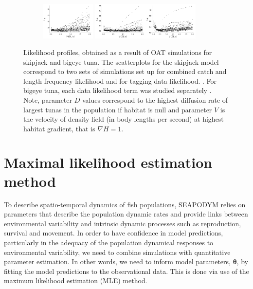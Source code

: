 \begin{figure}
\begin{subfigure}[b]{1.0\textwidth}
\includegraphics[width=0.3\textwidth]{chapter4/figs/SA-C-V-bet}
\includegraphics[width=0.3\textwidth]{chapter4/figs/SA-LF-V-bet}\includegraphics[width=0.3\textwidth]{chapter4/figs/SA-Tags-V-bet}\\
\end{subfigure}
\caption{Likelihood profiles, obtained as a result of OAT simulations for skipjack and bigeye tuna. The scatterplots for the skipjack model correspond to two sets of simulations set up for combined catch and length frequency likelihood and for tagging data likelihood. \citep*[From][]{Senina20b}. For bigeye tuna, each data likelihood term was studied separately \citep*[same results are shown in][]{Senina2020c}. Note, parameter $D$ values correspond to the highest diffusion rate of largest tunas in the population if habitat is null and parameter $V$ is the velocity of density field (in body lengths per second) at highest habitat gradient, that is $\nabla H=1$.}
\label{fig:OAT-profiles}
\end{figure}


\section{Maximal likelihood estimation method}\label{sec:mle}

To describe spatio-temporal dynamics of fish populations, SEAPODYM relies on parameters that describe the population dynamic rates and provide links between environmental variability and intrinsic dynamic processes such as reproduction, survival and movement. In order to have confidence in model predictions, particularly in the adequacy of the population dynamical responses to environmental variability, we need to combine simulations with quantitative parameter estimation. In other words, we need to inform model parameters, $\boldsymbol\theta$, by fitting the model predictions to the observational data. This is done via use of the maximum likelihood estimation (MLE) method. 


